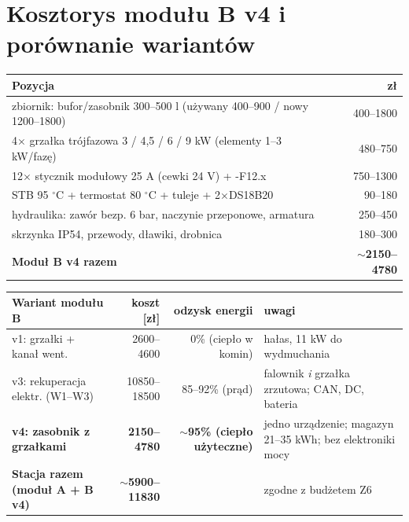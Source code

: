 \documentclass[11pt,a4paper]{article}
\begin{document}
\section{Kosztorys modułu B v4 i porównanie wariantów}
\label{sec:koszt}
\begin{longtable}{@{}p{}r@{}}
\toprule
\textbf{Pozycja} & \textbf{zł}\\
\midrule
zbiornik: bufor/zasobnik 300--500 l (używany 400--900 / nowy 1200--1800) & 400--1800\\
4$\times$ grzałka trójfazowa 3 / 4,5 / 6 / 9 kW (elementy 1--3 kW/fazę) & 480--750\\
12$\times$ stycznik modułowy 25 A (cewki 24 V) + -F12.x & 750--1300\\
STB 95 $^\circ$C + termostat 80 $^\circ$C + tuleje + 2$\times$DS18B20 & 90--180\\
hydraulika: zawór bezp. 6 bar, naczynie przeponowe, armatura & 250--450\\
skrzynka IP54, przewody, dławiki, drobnica & 180--300\\
\midrule
\textbf{Moduł B v4 razem} & \textbf{$\sim$2150--4780}\\
\bottomrule
\end{longtable}

\begin{longtable}{@{}p{}rrp{}@{}}
\toprule
\textbf{Wariant modułu B} & \textbf{koszt [zł]} & \textbf{odzysk energii} & \textbf{uwagi}\\
\midrule
v1: grzałki + kanał went. & 2600--4600 & 0\% (ciepło w komin) & hałas, 11 kW do wydmuchania\\
v3: rekuperacja elektr. (W1--W3) & 10850--18500 & 85--92\% (prąd) & falownik \emph{i} grzałka zrzutowa; CAN, DC, bateria\\
\textbf{v4: zasobnik z grzałkami} & \textbf{2150--4780} & \textbf{$\sim$95\% (ciepło użyteczne)} & jedno urządzenie; magazyn 21--35 kWh; bez elektroniki mocy\\
\midrule
\textbf{Stacja razem (moduł A + B v4)} & \textbf{$\sim$5900--11830} & & zgodne z budżetem Z6\\
\bottomrule
\end{longtable}
\end{document}
